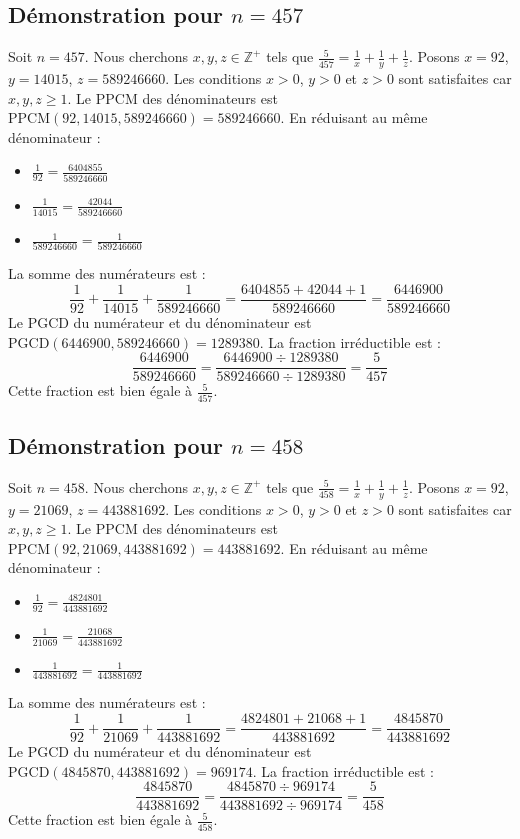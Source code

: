 \documentclass[11pt,a4paper]{article}
\begin{document}
\subsection{Démonstration pour $n = 457$}
Soit $n = 457$. Nous cherchons $x, y, z \in \mathbb{Z}^{+}$ tels que $\frac{5}{457} = \frac{1}{x} + \frac{1}{y} + \frac{1}{z}$.
Posons $x = 92$, $y = 14015$, $z = 589246660$.
Les conditions $x > 0$, $y > 0$ et $z > 0$ sont satisfaites car $x, y, z \geq 1$.
Le PPCM des dénominateurs est $\text{PPCM}(92, 14015, 589246660) = 589246660$.
En réduisant au même dénominateur :
\begin{itemize}
    \item $\frac{1}{92} = \frac{6404855}{589246660}$
    \item $\frac{1}{14015} = \frac{42044}{589246660}$
    \item $\frac{1}{589246660} = \frac{1}{589246660}$
\end{itemize}
La somme des numérateurs est :
$$ \frac{1}{92} + \frac{1}{14015} + \frac{1}{589246660} = \frac{6404855 + 42044 + 1}{589246660} = \frac{6446900}{589246660} $$
Le PGCD du numérateur et du dénominateur est $\text{PGCD}(6446900, 589246660) = 1289380$.
La fraction irréductible est :
$$ \frac{6446900}{589246660} = \frac{6446900 \div 1289380}{589246660 \div 1289380} = \frac{5}{457} $$
Cette fraction est bien égale à $\frac{5}{457}$.

\subsection{Démonstration pour $n = 458$}
Soit $n = 458$. Nous cherchons $x, y, z \in \mathbb{Z}^{+}$ tels que $\frac{5}{458} = \frac{1}{x} + \frac{1}{y} + \frac{1}{z}$.
Posons $x = 92$, $y = 21069$, $z = 443881692$.
Les conditions $x > 0$, $y > 0$ et $z > 0$ sont satisfaites car $x, y, z \geq 1$.
Le PPCM des dénominateurs est $\text{PPCM}(92, 21069, 443881692) = 443881692$.
En réduisant au même dénominateur :
\begin{itemize}
    \item $\frac{1}{92} = \frac{4824801}{443881692}$
    \item $\frac{1}{21069} = \frac{21068}{443881692}$
    \item $\frac{1}{443881692} = \frac{1}{443881692}$
\end{itemize}
La somme des numérateurs est :
$$ \frac{1}{92} + \frac{1}{21069} + \frac{1}{443881692} = \frac{4824801 + 21068 + 1}{443881692} = \frac{4845870}{443881692} $$
Le PGCD du numérateur et du dénominateur est $\text{PGCD}(4845870, 443881692) = 969174$.
La fraction irréductible est :
$$ \frac{4845870}{443881692} = \frac{4845870 \div 969174}{443881692 \div 969174} = \frac{5}{458} $$
Cette fraction est bien égale à $\frac{5}{458}$.
\end{document}
